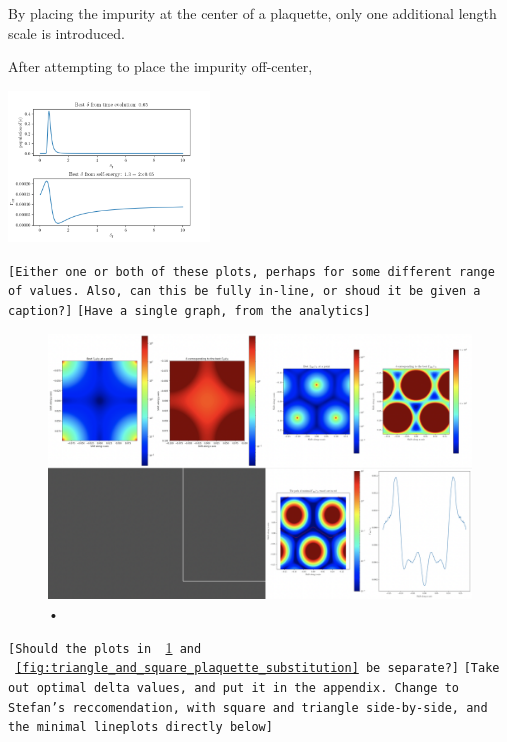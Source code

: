 \documentclass[aps,pra,superscriptaddress,twocolumn]{revtex4-1}
\newcommand{\fref}[1]{\text{Fig.}~\ref{#1}}
\newcommand{\commentSB}[1]{\texttt{\color{blue}[#1]}}
\newcommand{\commentTP}[1]{\texttt{\color{green}[#1]}}
\begin{document}
By placing the impurity at the center of a plaquette, only one additional length scale is introduced. 



After attempting to place the impurity off-center, 



\includegraphics[width=0.4\textwidth]{figures/delta_check.png} 

\commentSB{Either one or both of these plots, perhaps for some different range of values. Also, can this be fully in-line, or shoud it be given a caption?}
\commentTP{Have a single graph, from the analytics}

\begin{figure}
    \centering
    \includegraphics[width=1.0\textwidth]{figures/triangle_and_square_plaquette_interstitial.png} 
    \caption{•}
    \label{fig:triangle_and_square_plaquette_interstitial}
\end{figure}
\commentSB{Should the plots in \fref{fig:triangle_and_square_plaquette_interstitial} and \fref{fig:triangle_and_square_plaquette_substitution} be separate?}
\commentTP{Take out optimal delta values, and put it in the appendix. Change to Stefan's reccomendation, with square and triangle side-by-side, and the minimal lineplots directly below}
\end{document}
